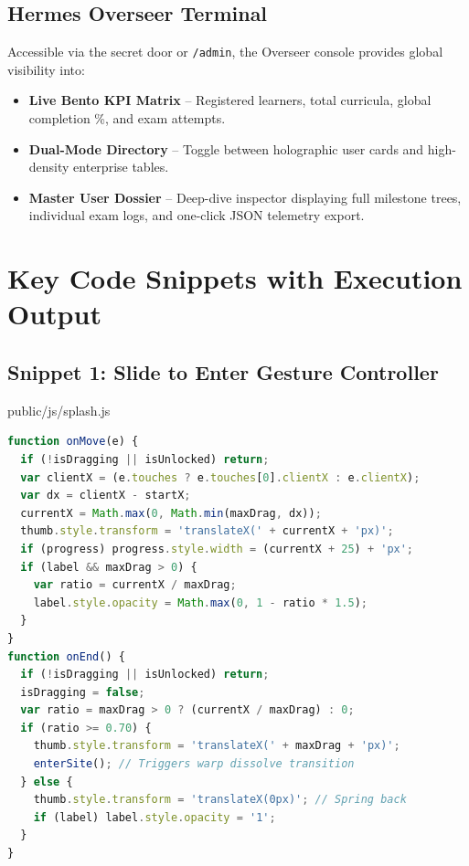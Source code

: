 \documentclass[12pt,a4paper]{article}
\begin{document}
\subsection{Hermes Overseer Terminal}
Accessible via the secret door or \texttt{/admin}, the Overseer console provides global visibility into:
\begin{itemize}[leftmargin=1.5em, itemsep=4pt]
    \item \textbf{Live Bento KPI Matrix} -- Registered learners, total curricula, global completion \%, and exam attempts.
    \item \textbf{Dual-Mode Directory} -- Toggle between holographic user cards and high-density enterprise tables.
    \item \textbf{Master User Dossier} -- Deep-dive inspector displaying full milestone trees, individual exam logs, and one-click JSON telemetry export.
\end{itemize}

\newpage

\section{Key Code Snippets with Execution Output}

\subsection{Snippet 1: Slide to Enter Gesture Controller}
\begin{codebox}{public/js/splash.js}
\begin{lstlisting}[language=JavaScript]
function onMove(e) {
  if (!isDragging || isUnlocked) return;
  var clientX = (e.touches ? e.touches[0].clientX : e.clientX);
  var dx = clientX - startX;
  currentX = Math.max(0, Math.min(maxDrag, dx));
  thumb.style.transform = 'translateX(' + currentX + 'px)';
  if (progress) progress.style.width = (currentX + 25) + 'px';
  if (label && maxDrag > 0) {
    var ratio = currentX / maxDrag;
    label.style.opacity = Math.max(0, 1 - ratio * 1.5);
  }
}
function onEnd() {
  if (!isDragging || isUnlocked) return;
  isDragging = false;
  var ratio = maxDrag > 0 ? (currentX / maxDrag) : 0;
  if (ratio >= 0.70) {
    thumb.style.transform = 'translateX(' + maxDrag + 'px)';
    enterSite(); // Triggers warp dissolve transition
  } else {
    thumb.style.transform = 'translateX(0px)'; // Spring back
    if (label) label.style.opacity = '1';
  }
}
\end{lstlisting}
\end{codebox}
\end{document}

